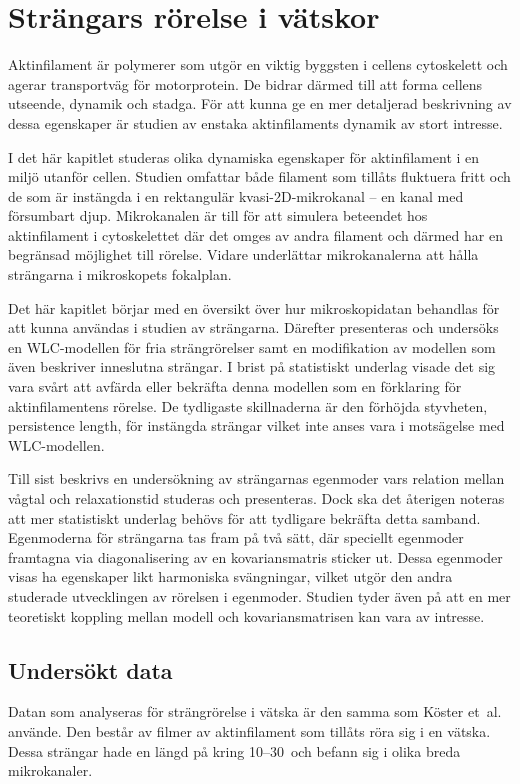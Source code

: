 \chapter{Strängars rörelse i vätskor}

Aktinfilament är polymerer som utgör en viktig byggsten i cellens cytoskelett och agerar transportväg för motorprotein. De bidrar därmed till att forma cellens utseende, dynamik och stadga. För att kunna ge en mer detaljerad beskrivning av dessa egenskaper är studien av enstaka aktinfilaments dynamik av stort intresse. 

I det här kapitlet studeras olika dynamiska egenskaper för aktinfilament i en miljö utanför cellen. Studien omfattar både filament som tillåts fluktuera fritt och de som är instängda i en rektangulär kvasi-2D-mikrokanal -- en kanal med försumbart djup. Mikrokanalen är till för att simulera beteendet hos aktinfilament i cytoskelettet där det omges av andra filament och därmed har en begränsad möjlighet till rörelse. Vidare underlättar mikrokanalerna att hålla strängarna i mikroskopets fokalplan.

Det här kapitlet börjar med en översikt över hur mikroskopidatan behandlas för att kunna användas i studien av strängarna. Därefter presenteras och undersöks en WLC-modellen för fria strängrörelser samt en modifikation av modellen som även beskriver inneslutna strängar. I brist på statistiskt underlag visade det sig vara svårt att avfärda eller bekräfta denna modellen som en förklaring för aktinfilamentens rörelse. De tydligaste skillnaderna är den förhöjda styvheten, persistence length, för instängda strängar vilket inte anses vara i motsägelse med WLC-modellen.

Till sist beskrivs en undersökning av strängarnas egenmoder vars relation mellan vågtal och relaxationstid studeras och presenteras. Dock ska det återigen noteras att mer statistiskt underlag behövs för att tydligare bekräfta detta samband. Egenmoderna för strängarna tas fram på två sätt, där speciellt egenmoder framtagna via diagonalisering av en kovariansmatris sticker ut. Dessa egenmoder visas ha egenskaper likt harmoniska svängningar, vilket utgör den andra studerade utvecklingen av rörelsen i egenmoder. Studien tyder även på att en mer teoretiskt koppling mellan modell och kovariansmatrisen kan vara av intresse. 

\section{Undersökt data}
Datan som analyseras för strängrörelse i vätska är den samma som Köster et~al.~\cite{Koster_etal2005,Koster_etal2007,Koster_etal2008} använde. Den består av filmer av aktinfilament som tillåts röra sig i en vätska. Dessa strängar hade en längd på kring 10--30\, och befann sig i olika breda mikrokanaler. 


